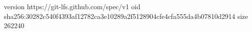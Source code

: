 version https://git-lfs.github.com/spec/v1
oid sha256:30282c540f4393af12782ca3e10289a2f5128904cfe4cfa555da4b07810d2914
size 262240
